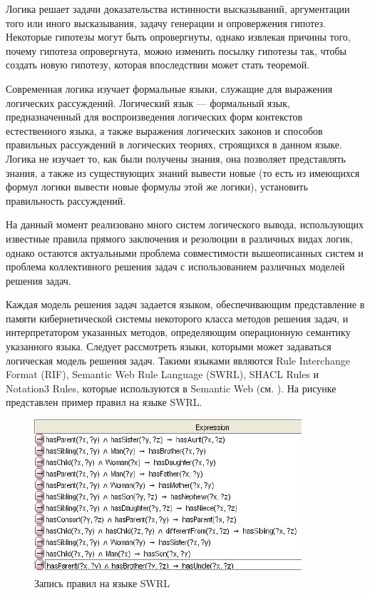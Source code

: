 Логика решает задачи доказательства истинности высказываний, аргументации того или иного высказывания, задачу генерации и опровержения гипотез. Некоторые гипотезы могут быть опровергнуты, однако извлекая причины того, почему гипотеза опровергнута, можно изменить посылку гипотезы так, чтобы создать новую гипотезу, которая впоследствии может стать теоремой.

Современная логика изучает формальные языки, служащие для выражения логических рассуждений. Логический язык — формальный язык, предназначенный для воспроизведения логических форм контекстов естественного языка, а также выражения логических законов и способов правильных рассуждений в логических теориях, строящихся в данном языке. Логика не изучает то, как были получены знания, она позволяет представлять знания, а также из существующих знаний вывести новые (то есть из имеющихся формул логики вывести новые формулы этой же логики), установить правильность рассуждений.

На данный момент реализовано много систем логического вывода, использующих известные правила прямого заключения и резолюции в различных видах логик, однако остаются актуальными проблема совместимости вышеописанных систем и проблема коллективного решения задач с использованием различных моделей решения задач.

Каждая модель решения задач задается языком, обеспечивающим представление в памяти кибернетической системы некоторого класса методов решения задач, и интерпретатором указанных методов, определяющим операционную семантику указанного языка. Следует рассмотреть языки, которыми может задаваться логическая модель решения задач. Такими языками являются Rule Interchange Format (RIF), Semantic Web Rule Language (SWRL), SHACL Rules и Notation3 Rules, которые используются в Semantic Web (см. ). На рисунке  представлен пример правил на языке SWRL.

\begin{figure}[http]
	\includegraphics[scale=0.8]{author/part3/figures/swrl_example.png}
	\caption{Запись правил на языке SWRL}
	\label{fig:swrl_example}
\end{figure}


